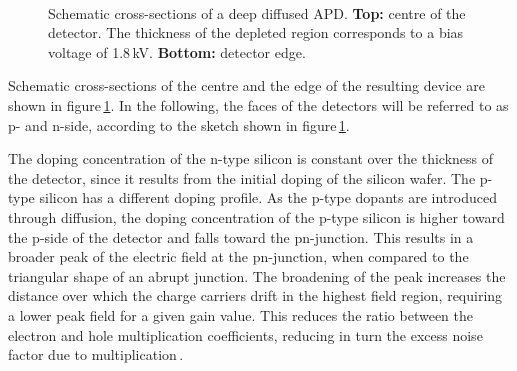 \documentclass[review,number,sort&compress]{elsarticle}
\begin{document}
\begin{figure}
  \centering
  \\
  \caption{Schematic cross-sections of a deep diffused APD. {\bf Top:} centre of the detector. The thickness of the depleted region corresponds to a bias voltage of 1.8\,kV. {\bf Bottom:} detector edge.}
  \label{fig:apdDia}
\end{figure}

Schematic cross-sections of the centre and the edge of the resulting device are shown in figure\,\ref{fig:apdDia}.
In the following, the faces of the detectors will be referred to as p- and n-side, according to the sketch shown in figure\,\ref{fig:apdDia}.

The doping concentration of the n-type silicon is constant over the thickness of the detector, since it results from the initial doping of the silicon wafer.
The p-type silicon has a different doping profile.
As the p-type dopants are introduced through diffusion, the doping concentration of the p-type silicon is higher toward the p-side of the detector and falls toward the pn-junction.
This results in a broader peak of the electric field at the pn-junction, when compared to the triangular shape of an abrupt junction.
The broadening of the peak increases the distance over which the charge carriers drift in the highest field region, requiring a lower peak field for a given gain value.
This reduces the ratio between the electron and hole multiplication coefficients, reducing in turn the excess noise factor due to multiplication\,\cite{theoryDDAPD}.
\end{document}
